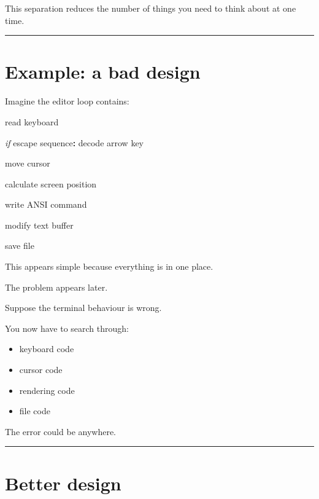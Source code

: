 \documentclass[
  oneside,
  openany]{book}
\newenvironment{Shaded}{\begin{snugshade}}{\end{snugshade}}
\newcommand{\DataTypeTok}[1]{\textcolor[rgb]{0.13,0.29,0.53}{#1}}
\newcommand{\NormalTok}[1]{#1}
\newcommand{\OperatorTok}[1]{\textcolor[rgb]{0.81,0.36,0.00}{\textbf{#1}}}
\newcommand{\PreprocessorTok}[1]{\textcolor[rgb]{0.56,0.35,0.01}{\textit{#1}}}
\providecommand{\tightlist}{%
  \setlength{\itemsep}{0pt}\setlength{\parskip}{0pt}}
\begin{document}
This separation reduces the number of things you need to think about at
one time.

\begin{center}\rule{0.5\linewidth}{0.5pt}\end{center}

\hypertarget{example-a-bad-design}{%
\section{Example: a bad design}\label{example-a-bad-design}}

Imagine the editor loop contains:

\begin{Shaded}
\begin{Highlighting}[]
\NormalTok{read keyboard}

\PreprocessorTok{if}\NormalTok{ escape sequence}\OperatorTok{:}
\NormalTok{    decode arrow key}

\NormalTok{move cursor}

\NormalTok{calculate screen position}

\NormalTok{write ANSI command}

\NormalTok{modify text buffer}

\NormalTok{save }\DataTypeTok{file}
\end{Highlighting}
\end{Shaded}

This appears simple because everything is in one place.

The problem appears later.

Suppose the terminal behaviour is wrong.

You now have to search through:

\begin{itemize}
\tightlist
\item
  keyboard code
\item
  cursor code
\item
  rendering code
\item
  file code
\end{itemize}

The error could be anywhere.

\begin{center}\rule{0.5\linewidth}{0.5pt}\end{center}

\hypertarget{better-design}{%
\section{Better design}\label{better-design}}
\end{document}
